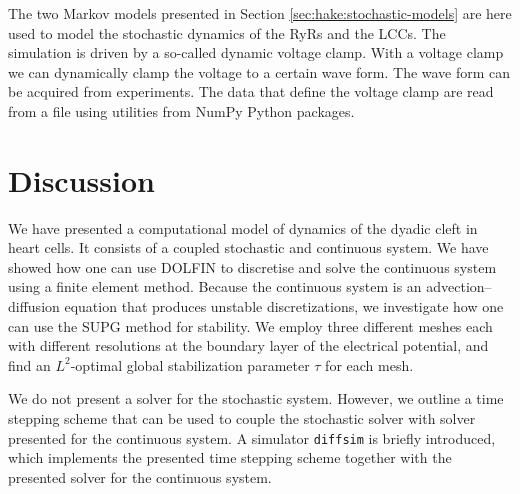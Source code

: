 The two Markov models presented in Section
\ref{sec:hake:stochastic-models} are here used to model the stochastic
dynamics of the RyRs and the LCCs. The simulation is driven by a
so-called dynamic voltage clamp. With a voltage clamp we can
dynamically clamp the voltage to a certain wave form. The wave form
can be acquired from experiments. The data that define the voltage
clamp are read from a file using utilities from NumPy Python packages.

\section{Discussion}

We have presented a computational model of \Ca dynamics of the dyadic
cleft in heart cells. It consists of a coupled stochastic and
continuous system. We have showed how one can use DOLFIN to discretise
and solve the continuous system using a finite element method. Because
the continuous system is an advection--diffusion equation that produces
unstable discretizations, we investigate how one can use the SUPG
method for stability. We employ three different meshes each with
different resolutions at the boundary layer of the electrical
potential, and find an $L^2$-optimal global stabilization parameter
$\tau$ for each mesh.

We do not present a solver for the stochastic system. However, we
outline a time stepping scheme that can be used to couple the
stochastic solver with solver presented for the continuous system. A
simulator \texttt{diffsim} is briefly introduced, which implements the
presented time stepping scheme together with the presented solver for
the continuous system.
